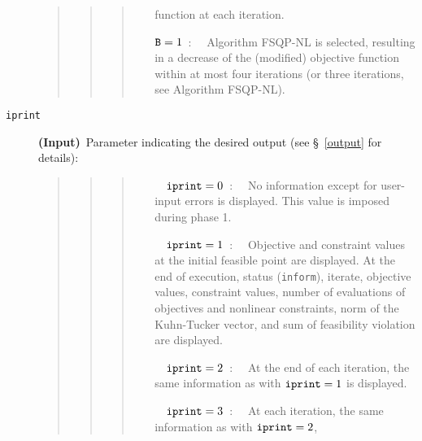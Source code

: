 \begin{description}
\begin{quote}
\begin{quote}
\begin{quote}
\begin{itemize}
                                           function at each iteration.
                  \item[${\tt B} = 1$~:~~]Algorithm FSQP-NL is 
                                           selected, resulting in a 
                                           decrease of the (modified) objective
                                           function within at 
                                           most four iterations (or three
                                           iterations, see Algorithm FSQP-NL).
                  \end{itemize}
                  \end{quote}
                  \end{quote}
                  \end{quote}
\item[\tt iprint] {\bf (Input)}~Parameter indicating the 
                  desired output (see \S~\ref{output} for details):
                  \begin{quote}
                  \begin{quote}
                  \begin{quote}
                  \begin{itemize}
                  \item[~~${\tt iprint} =0$~:~~] No information except 
                                for user-input errors is displayed. This value
                                is imposed during phase 1.
                  \item[~~${\tt iprint} =1$~:~~] 
                                Objective and constraint values 
                                at the initial feasible point are displayed.
                                At the end of execution, status ({\tt inform}),
                                iterate, objective values, constraint values,
                                number of evaluations of objectives and 
                                nonlinear constraints, norm of the Kuhn-Tucker 
                                vector, and sum of feasibility violation
                                are displayed.
                  \item[~~${\tt iprint} =2$~:~~] At the end of each 
                                iteration, the same information as with
                                ${\tt iprint}=1$ is displayed.
                  \item[~~${\tt iprint} =3$~:~~] At each iteration, 
                                the same information as with ${\tt iprint}=2$, 

\end{itemize}
\end{quote}
\end{quote}
\end{quote}
\end{description}
